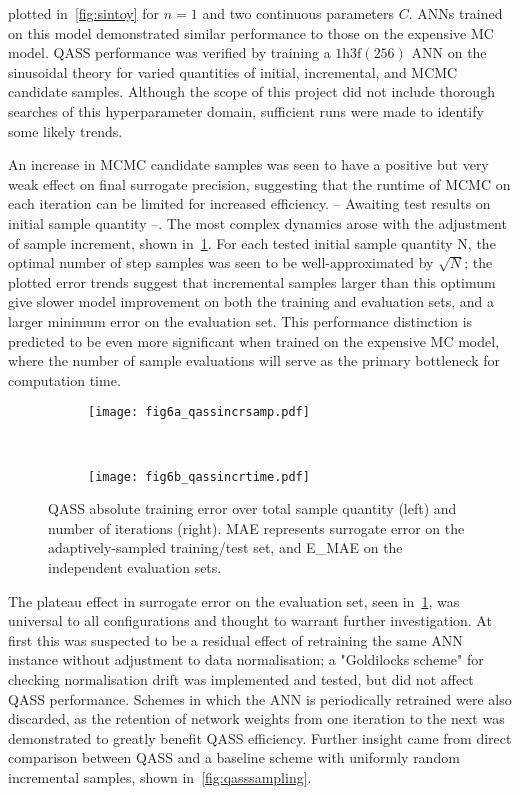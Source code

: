 plotted in~\cref{fig:sintoy} for $n=1$ and two continuous parameters $C$. ANNs
trained on this model demonstrated similar performance to those on the expensive
MC model. QASS performance was verified by training a $\text{1h3f}(256)$ ANN on
the sinusoidal theory for varied quantities of initial, incremental, and MCMC
candidate samples. Although the scope of this project did not include thorough
searches of this hyperparameter domain, sufficient runs were made to identify
some likely trends.

An increase in MCMC candidate samples was seen to have a positive but very weak
effect on final surrogate precision, suggesting that the runtime of MCMC on each
iteration can be limited for increased efficiency. -- Awaiting test results on
initial sample quantity --. The most complex dynamics arose with the adjustment
of sample increment, shown in~\cref{fig:qassincr}. For each tested initial sample quantity N, the optimal number of step samples was seen to be well-approximated by $\sqrt{N}$; the plotted error trends suggest that incremental samples larger than this optimum give slower model improvement on both the training and evaluation sets, and a larger minimum error on the evaluation set. This performance distinction is predicted to be even more significant when trained on the expensive MC model, where the number of sample evaluations will serve as the primary bottleneck for computation time.
\begin{figure}[h!]
    \centering
    \begin{subfigure}[t]{0.5\textwidth}
        \centering
        \texttt{[image: fig6a\_qassincrsamp.pdf]}
    \end{subfigure}%
    ~ 
    \begin{subfigure}[t]{0.5\textwidth}
        \centering
        \texttt{[image: fig6b\_qassincrtime.pdf]}
    \end{subfigure}
    \caption{QASS absolute training error over total sample quantity (left) and number of iterations (right). MAE represents surrogate error on the adaptively-sampled training/test set, and E\_MAE on the independent evaluation sets.}
    \label{fig:qassincr}
\end{figure}

The plateau effect in surrogate error on the evaluation set, seen
in~\cref{fig:qassincr}, was universal to all configurations and thought to
warrant further investigation. At first this was suspected to be a residual
effect of retraining the same ANN instance without adjustment to data
normalisation; a "Goldilocks scheme" for checking normalisation drift was
implemented and tested, but did not affect QASS performance. Schemes in which
the ANN is periodically retrained were also discarded, as the retention of
network weights from one iteration to the next was demonstrated to greatly
benefit QASS efficiency. Further insight came from direct comparison between
QASS and a baseline scheme with uniformly random incremental samples, shown
in~\cref{fig:qasssampling}.

